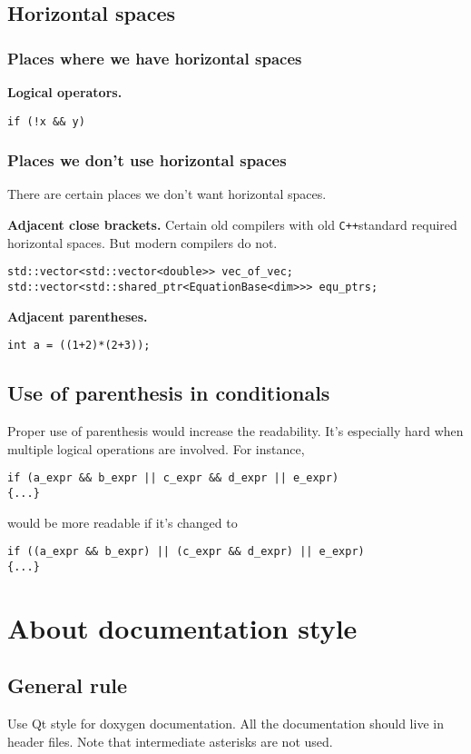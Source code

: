 \documentclass{article}
\newcommand{\cpp}{{\tt C++}}
\begin{document}
\subsection{Horizontal spaces}
\subsubsection{Places where we have horizontal spaces}
{\bf Logical operators.}
\begin{lstlisting}
if (!x && y)
\end{lstlisting}

\subsubsection{Places we don't use horizontal spaces}
There are certain places we don't want horizontal spaces. 

{\bf Adjacent close brackets.} Certain old compilers with old \cpp standard required horizontal spaces. But modern compilers do not.
\begin{lstlisting}
std::vector<std::vector<double>> vec_of_vec;
std::vector<std::shared_ptr<EquationBase<dim>>> equ_ptrs;
\end{lstlisting}

{\bf Adjacent parentheses.}
\begin{lstlisting}
int a = ((1+2)*(2+3));
\end{lstlisting}

\subsection{Use of parenthesis in conditionals}
Proper use of parenthesis would increase the readability. It's especially hard when multiple logical operations are involved. For instance,
\begin{lstlisting}
if (a_expr && b_expr || c_expr && d_expr || e_expr)
{...}
\end{lstlisting}
would be more readable if it's changed to
\begin{lstlisting}
if ((a_expr && b_expr) || (c_expr && d_expr) || e_expr)
{...}
\end{lstlisting}

\section{About documentation style}
\subsection{General rule}
Use Qt style for doxygen documentation. All the documentation should live in header files. Note that intermediate asterisks are not used.
\end{document}
